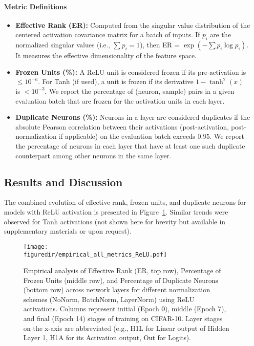\paragraph{Metric Definitions}
\begin{itemize}
    \item \textbf{Effective Rank (ER):} Computed from the singular value distribution of the centered activation covariance matrix for a batch of inputs. If $p_i$ are the normalized singular values (i.e., $\sum p_i = 1$), then ER = $\exp(-\sum p_i \log p_i)$. It measures the effective dimensionality of the feature space.
    \item \textbf{Frozen Units (\%):} A ReLU unit is considered frozen if its pre-activation is $\le 10^{-6}$. For Tanh (if used), a unit is frozen if its derivative $1-\tanh^2(x)$ is $<10^{-3}$. We report the percentage of (neuron, sample) pairs in a given evaluation batch that are frozen for the activation units in each layer.
    \item \textbf{Duplicate Neurons (\%):} Neurons in a layer are considered duplicates if the absolute Pearson correlation between their activations (post-activation, post-normalization if applicable) on the evaluation batch exceeds $0.95$. We report the percentage of neurons in each layer that have at least one such duplicate counterpart among other neurons in the same layer.
\end{itemize}

\subsection{Results and Discussion}
The combined evolution of effective rank, frozen units, and duplicate neurons for models with ReLU activation is presented in Figure~\ref{fig:empirical_all_metrics_relu}. Similar trends were observed for Tanh activations (not shown here for brevity but available in supplementary materials or upon request).

\begin{figure}[H] %
    \centering
    \texttt{[image: \\figuredir/empirical\_all\_metrics\_ReLU.pdf]}
    \caption{Empirical analysis of Effective Rank (ER, top row), Percentage of Frozen Units (middle row), and Percentage of Duplicate Neurons (bottom row) across network layers for different normalization schemes (NoNorm, BatchNorm, LayerNorm) using ReLU activations. Columns represent initial (Epoch 0), middle (Epoch 7), and final (Epoch 14) stages of training on CIFAR-10. Layer stages on the x-axis are abbreviated (e.g., H1L for Linear output of Hidden Layer 1, H1A for its Activation output, Out for Logits).}
    \label{fig:empirical_all_metrics_relu}
\end{figure}

